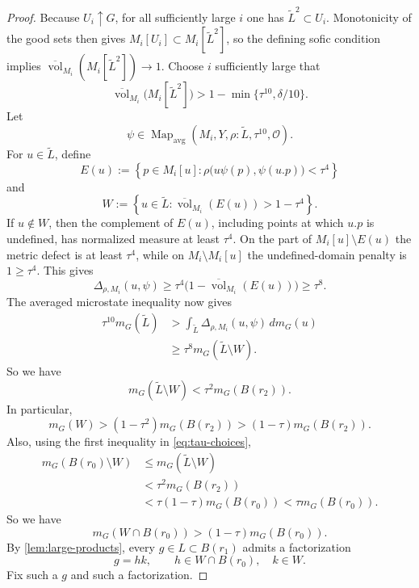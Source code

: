 \documentclass[12pt]{amsart}
\theoremstyle{definition}
\newcommand{\Haar}{m_G}
\newcommand{\vol}{\operatorname{vol}}
\newcommand{\Mapavg}{\operatorname{Map}_{\mathrm{avg}}}
\newcommand{\cO}{\mathcal O}
\newcommand{\1}{\mathbf 1}
\newcommand{\dbar}{\overline{\vol}}
\begin{document}
\begin{proof}
Because $U_i\uparrow G$, for all sufficiently large $i$ one has
$\widetilde L^2\subset U_i$. Monotonicity of the good sets then gives
$M_i[U_i]\subset M_i[\widetilde L^2]$, so the defining sofic
condition implies
$\dbar_{M_i}(M_i[\widetilde L^2])\to1$. Choose $i$ sufficiently large
that
\begin{equation}\label{eq:comparison-core}
 \dbar_{M_i}\bigl(M_i[\widetilde L^2]\bigr)
 >1-\min\{\tau^{10},\delta/10\}.
\end{equation}
Let
\[
 \psi\in\Mapavg(M_i,Y,\rho:\widetilde L,\tau^{10},\cO).
\]
For $u\in\widetilde L$, define
\[
 E(u):=\left\{p\in M_i[u]:
 \rho\bigl(u\psi(p),\psi(u.p)\bigr)<\tau^4\right\}
\]
and
\[
 W:=\left\{u\in\widetilde L:
 \dbar_{M_i}(E(u))>1-\tau^4\right\}.
\]
If $u\notin W$, then the complement of $E(u)$, including points at which $u.p$ is undefined, has normalized measure at least $\tau^4$. On the part of $M_i[u]\setminus E(u)$ the metric defect is at least $\tau^4$, while on $M_i\setminus M_i[u]$ the undefined-domain penalty is $1\geq\tau^4$. This gives
\[
 \Delta_{\rho,M_i}(u,\psi)
 \geq \tau^4\bigl(1-\dbar_{M_i}(E(u))\bigr)
 \geq\tau^8.
\]
The averaged microstate inequality now gives
\begin{align*}
 \tau^{10}\Haar(\widetilde L)
 &>\int_{\widetilde L}\Delta_{\rho,M_i}(u,\psi)\,d\Haar(u)\\
 &\geq\tau^8\Haar(\widetilde L\setminus W).
\end{align*}
So we have
\begin{equation}\label{eq:good-group-elements}
 \Haar(\widetilde L\setminus W)<\tau^2\Haar(B(r_2)).
\end{equation}
In particular,
\[
 \Haar(W)>(1-\tau^2)\Haar(B(r_2))
 >(1-\tau)\Haar(B(r_2)).
\]
Also, using the first inequality in \eqref{eq:tau-choices},
\begin{align*}
 \Haar(B(r_0)\setminus W)
 &\leq \Haar(\widetilde L\setminus W)\\
 &<\tau^2\Haar(B(r_2))\\
 &<\tau(1-\tau)\Haar(B(r_0))
 <\tau\Haar(B(r_0)).
\end{align*}
So we have
\[
 \Haar(W\cap B(r_0))>(1-\tau)\Haar(B(r_0)).
\]
By \cref{lem:large-products}, every $g\in L\subset B(r_1)$ admits a factorization
\begin{equation}\label{eq:g-hk-factorization}
 g=hk,
 \qquad h\in W\cap B(r_0),\quad k\in W.
\end{equation}
Fix such a $g$ and such a factorization.


\end{proof}
\end{document}
